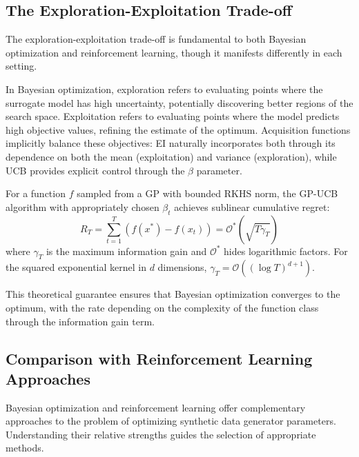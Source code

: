 \subsection{The Exploration-Exploitation Trade-off}
\label{subsec:exploration_exploitation}

The exploration-exploitation trade-off is fundamental to both Bayesian optimization and reinforcement learning, though it manifests differently in each setting.

In Bayesian optimization, exploration refers to evaluating points where the surrogate model has high uncertainty, potentially discovering better regions of the search space. Exploitation refers to evaluating points where the model predicts high objective values, refining the estimate of the optimum. Acquisition functions implicitly balance these objectives: EI naturally incorporates both through its dependence on both the mean (exploitation) and variance (exploration), while UCB provides explicit control through the $\beta$ parameter.

\begin{theorem}
\label{thm:gp_ucb_regret}
For a function $f$ sampled from a GP with bounded RKHS norm, the GP-UCB algorithm with appropriately chosen $\beta_t$ achieves sublinear cumulative regret:
\begin{equation}
R_T = \sum_{t=1}^{T} (f(x^*) - f(x_t)) = \mathcal{O}^*(\sqrt{T \gamma_T})
\end{equation}
where $\gamma_T$ is the maximum information gain and $\mathcal{O}^*$ hides logarithmic factors. For the squared exponential kernel in $d$ dimensions, $\gamma_T = \mathcal{O}((\log T)^{d+1})$.
\end{theorem}

This theoretical guarantee ensures that Bayesian optimization converges to the optimum, with the rate depending on the complexity of the function class through the information gain term.

\subsection{Comparison with Reinforcement Learning Approaches}
\label{subsec:bo_vs_rl}

Bayesian optimization and reinforcement learning offer complementary approaches to the problem of optimizing synthetic data generator parameters. Understanding their relative strengths guides the selection of appropriate methods.

